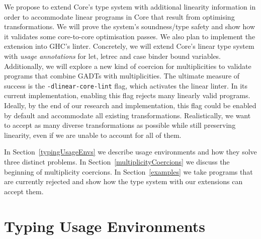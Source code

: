 \documentclass[a4paper, draft]{report}
\begin{document}

We propose to extend Core's type system with additional linearity
information in order to accommodate linear programs in Core that
result from optimising transformations. We will prove the system's
soundness/type safety and show how it validates some core-to-core optimisation
passes. We also plan to implement the extension into GHC's
linter. Concretely, we will extend Core's linear type system with
\emph{usage annotations} for let, letrec and case binder bound
variables. Additionally, we will explore a new kind of coercion for
multiplicities to validate programs that combine GADTs with
multiplicities.
%
The ultimate measure of success is the \verb=-dlinear-core-lint= flag,
which activates the linear linter. In its current implementation,
enabling this flag rejects many linearly valid programs. Ideally, by
the end of our research and implementation, this flag could be enabled by
default and accommodate all existing transformations. Realistically, we want to
accept as many diverse transformations as possible while still preserving
linearity, even if we are unable to account for all of them.

In Section~\ref{typingUsageEnvs} we describe usage environments and how they
solve three distinct problems. In Section~\ref{multiplicityCoercions} we discuss
the beginning of multiplicity coercions. In Section~\ref{examples} we take
programs that are currently rejected and show how the type system with our
extensions can accept them.




\section{Typing Usage Environments\label{typingUsageEnvs}}
\end{document}
